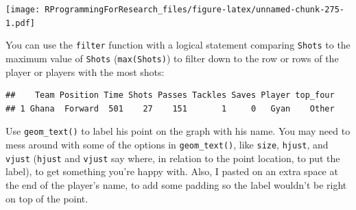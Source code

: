 \documentclass[]{book}
\makeatletter
\newenvironment{Shaded}{\begin{snugshade}}{\end{snugshade}}
\newcommand{\KeywordTok}[1]{\textcolor[rgb]{0.13,0.29,0.53}{\textbf{#1}}}
\newcommand{\StringTok}[1]{\textcolor[rgb]{0.31,0.60,0.02}{#1}}
\newcommand{\OperatorTok}[1]{\textcolor[rgb]{0.81,0.36,0.00}{\textbf{#1}}}
\newcommand{\NormalTok}[1]{#1}
\newenvironment{kframe}{%
\medskip{}
\setlength{\fboxsep}{.8em}
 \def\at@end@of@kframe{}%
 \ifinner\ifhmode%
  \def\at@end@of@kframe{\end{minipage}}%
  \begin{minipage}{\columnwidth}%
 \fi\fi%
 \def\FrameCommand##1{\hskip\@totalleftmargin \hskip-\fboxsep
 \colorbox{shadecolor}{##1}\hskip-\fboxsep
     \hskip-\linewidth \hskip-\@totalleftmargin \hskip\columnwidth}%
 \MakeFramed {\advance\hsize-\width
   \@totalleftmargin\z@ \linewidth\hsize
   \@setminipage}}%
 {\par\unskip\endMakeFramed%
 \at@end@of@kframe}
\renewenvironment{Shaded}{\begin{kframe}}{\end{kframe}}
\theoremstyle{definition}
\theoremstyle{definition}
\theoremstyle{definition}
\theoremstyle{remark}
\makeatother
\begin{document}
\texttt{[image: RProgrammingForResearch\_files/figure-latex/unnamed-chunk-275-1.pdf]}

You can use the \texttt{filter} function with a logical statement
comparing \texttt{Shots} to the maximum value of \texttt{Shots}
(\texttt{max(Shots)}) to filter down to the row or rows of the player or
players with the most shots:

\begin{Shaded}
\end{Shaded}

\begin{verbatim}
##    Team Position Time Shots Passes Tackles Saves Player top_four
## 1 Ghana  Forward  501    27    151       1     0   Gyan    Other
\end{verbatim}

Use \texttt{geom\_text()} to label his point on the graph with his name.
You may need to mess around with some of the options in
\texttt{geom\_text()}, like \texttt{size}, \texttt{hjust}, and
\texttt{vjust} (\texttt{hjust} and \texttt{vjust} say where, in relation
to the point location, to put the label), to get something you're happy
with. Also, I pasted on an extra space at the end of the player's name,
to add some padding so the label wouldn't be right on top of the point.
\end{document}
